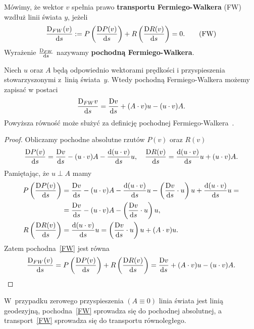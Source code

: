 \begin{definition}Mówimy, że wektor $v$ spełnia prawo \textbf{transportu 
Fermiego-Walkera} (FW) wzdłuż linii świata $y$, jeżeli
\begin{align} 
\frac{\text{D}_{FW} (v)}{\text{d} s}  :=  P \left(\frac{\text{D} P(v)}{\text{d} s} \right) +
R \left( \frac{\text{D} R(v)}{\text{d} s} \right) = 0 .
\tag{FW} \label{FW}
\end{align}
Wyrażenie $ \frac{{\text{D}}_{FW} }{\text{d} s}$ nazywamy \textbf{pochodną
Fermiego-Walkera}. 
\end{definition}
\begin{theorem}
Niech $u$ oraz $A$ 
będą odpowiednio wektorami
prędkości i przyspieszenia stowarzyszonymi z~linią świata~$y$.
Wtedy pochodną Fermiego-Walkera możemy zapisać w postaci
\begin{align} 
\frac{\text{D}_{FW} v}{\text{d} s}   = 
\frac{\text{D} v}{\text{d} s} +
(A\cdot v) u - (u\cdot v) A.
\end{align}
Powyższa równość może służyć za definicję
pochodnej Fermiego-Walkera~\cite{synge1960}.
\end{theorem}
\begin{proof}
Obliczamy pochodne absolutne rzutów $P(v)$ oraz $R(v)$
\begin{align*}
\frac{\text{D} P(v)}{\text{d} s} = \frac{\text{D} v}{\text{d} s} - (u\cdot v) A  
- \frac{\text{d} (u \cdot v)}{\text{d} s} u, \quad
\frac{\text{D} R(v)}{\text{d} s} =\frac{\text{d} (u \cdot v)}{\text{d} s} u + (u\cdot v) A .
\end{align*}
Pamiętając, że $u \perp A$ mamy
\begin{align*}
P \left( \frac{\text{D} P(v)}{\text{d} s}  \right) 
&= \frac{\text{D} v}{\text{d} s} - (u\cdot v) A  
- \frac{\text{d} (u \cdot v)}{\text{d} s} u 
-\left(\frac{\text{D} v}{\text{d} s} \cdot u \right)u 
+ \frac{\text{d} (u \cdot v)}{\text{d} s} u =\\
&= \frac{\text{D} v}{\text{d} s} - (u\cdot v) A  
-\left(\frac{\text{D} v}{\text{d} s} \cdot u \right)u ,\\
R\left( \frac{\text{D} R(v)}{\text{d} s} \right) 
&=\frac{\text{d} (u \cdot v)}{\text{d} s} u  = 
\left(\frac{\text{D} v}{\text{d} s} \cdot u \right)u 
+ (A\cdot v)u .
\end{align*}
Zatem pochodna~\eqref{FW} jest równa 
\begin{align} 
\frac{\text{D}_{FW} (v)}{\text{d} s} = P \left(\frac{\text{D} P(v)}{\text{d} s} \right) +
R \left( \frac{\text{D} R(v)}{\text{d} s} \right) = 
\frac{\text{D} v}{\text{d} s} +
(A\cdot v) u - (u\cdot v) A.
\end{align}
\end{proof}
W~przypadku zerowego przyspieszenia $(A\equiv 0)$ linia świata
jest linią geodezyjną, pochodna~\eqref{FW} sprowadza się 
do pochodnej absolutnej, a transport~\eqref{FW} sprowadza się 
do transportu równoległego. 

